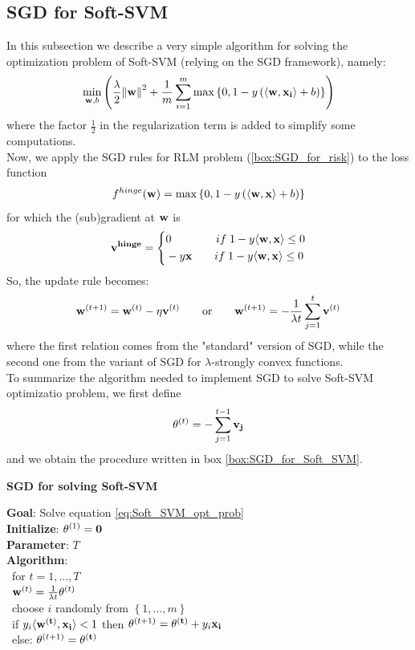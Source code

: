 \documentclass[12pt]{report}
\theoremstyle{plain}
\newcommand\sprod[2]{\langle \vb{#1},\vb{#2}\rangle}
\begin{document}
\begin{flushleft}
\subsection{SGD for Soft-SVM}
In this subsection we describe a very simple algorithm for solving the optimization problem of Soft-SVM (relying on the SGD framework), namely:
\begin{equation}
\min_{\vb{w},b}\left(\frac{\lambda}{2}\norm{\vb{w}}^2+\frac{1}{m}\sum_{i=1}^m \max\left\{0,1-y\left(\sprod{w}{x_i}+b\right)\right\} \right)
\label{eq:Soft_SVM_opt_prob}
\end{equation} 
where the factor $\frac{1}{2}$ in the regularization term is added to simplify some computations.\\
Now, we apply the SGD rules for RLM problem (\ref{box:SGD_for_risk}) to the loss function 
\[ f^{hinge}(\vb{w}) = \max\left\{0,1-y\left(\sprod{w}{x}+b\right)\right\} \]
for which the (sub)gradient at $\vb{w}$ is
\[ \vb{v^{hinge}}=\left\{\begin{aligned}
&0\qquad\qquad if\;1-y\sprod{w}{x}\leq 0\\&-y\vb{x}\qquad if\;1-y\sprod{w}{x}\leq 0
\end{aligned}\right. \]
So, the update rule becomes:
\[ \vb{w}^{(t+1)}=\vb{w}^{(t)}-\eta\vb{v}^{(t)} \qquad\text{or}\qquad \vb{w}^{(t+1)}=-\frac{1}{\lambda t}\sum_{j=1}^t\vb{v}^{(t)} \]
where the first relation comes from the "standard" version of SGD, while the second one from the variant of SGD for $\lambda$-strongly convex functions.\\
To summarize the algorithm needed to implement SGD to solve Soft-SVM optimizatio problem, we first define 
\[ \vb{\theta}^{(t)}=-\sum_{j=1}^{t-1}\vb{v_j} \]
and we obtain the procedure written in box \ref{box:SGD_for_Soft_SVM}.
\begin{tcolorbox}
	\begin{center}
		\textbf{SGD for solving Soft-SVM}
	\end{center}
	\textbf{Goal}: \quad Solve equation \ref{eq:Soft_SVM_opt_prob}\\ 
	\textbf{Initialize}: \quad $\vb{\theta}^{(1)}=\vb{0}$\\
	\textbf{Parameter}: \qquad $T$\\
	\textbf{Algorithm}:\\
	\-\ \qquad for  $t=1,\dots,T$\\
	\-\ \qquad\quad $\vb{w}^{(t)} = \frac{1}{\lambda t}\vb{\theta}^{(t)}$\\
	\-\ \qquad\quad choose $i$ randomly from $\left\{1,\dots,m\right\}$\\
	\-\ \qquad\quad if $y_i\sprod{w^{(t)}}{x_i}<1$ then $\vb{\theta}^{(t+1)}=\vb{\theta^{(t)}}+y_i\vb{x_i}$\\
	\-\ \qquad\quad else: $\vb{\theta}^{(t+1)}=\vb{\theta^{(t)}}$\\
	

\end{tcolorbox}
\end{flushleft}
\end{document}
